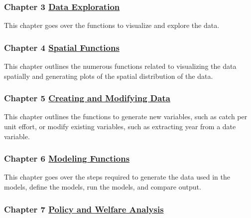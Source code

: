 \documentclass[
]{article}
\begin{document}
\hypertarget{chapter-3-data-exploration}{%
\subsubsection{\texorpdfstring{Chapter 3 \protect\hyperlink{data-exploration}{Data Exploration}}{Chapter 3 Data Exploration}}\label{chapter-3-data-exploration}}

This chapter goes over the functions to visualize and explore the data.

\hypertarget{chapter-4-spatial-functions}{%
\subsubsection{\texorpdfstring{Chapter 4 \protect\hyperlink{spatial-functions}{Spatial Functions}}{Chapter 4 Spatial Functions}}\label{chapter-4-spatial-functions}}

This chapter outlines the numerous functions related to visualizing the data spatially and generating plots of the spatial distribution of the data.

\hypertarget{chapter-5-creating-and-modifying-data}{%
\subsubsection{\texorpdfstring{Chapter 5 \protect\hyperlink{creating-and-modifying-data}{Creating and Modifying Data}}{Chapter 5 Creating and Modifying Data}}\label{chapter-5-creating-and-modifying-data}}

This chapter outlines the functions to generate new variables, such as catch per unit effort, or modify existing variables, such as extracting year from a date variable.

\hypertarget{chapter-6-modeling-functions}{%
\subsubsection{\texorpdfstring{Chapter 6 \protect\hyperlink{modeling-functions-1}{Modeling Functions}}{Chapter 6 Modeling Functions}}\label{chapter-6-modeling-functions}}

This chapter goes over the steps required to generate the data used in the models, define the models, run the models, and compare output.

\hypertarget{chapter-7-policy-and-welfare-analysis}{%
\subsubsection{\texorpdfstring{Chapter 7 \protect\hyperlink{policy-and-welfare-analysis}{Policy and Welfare Analysis}}{Chapter 7 Policy and Welfare Analysis}}\label{chapter-7-policy-and-welfare-analysis}}
\end{document}
